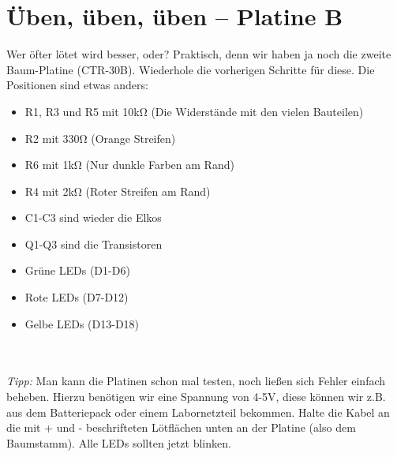 \documentclass[10pt]{article}
\begin{document}
	\section{Üben, üben, üben – Platine B}
	Wer öfter lötet wird besser, oder? Praktisch, denn wir haben ja noch die zweite Baum-Platine (CTR-30B). Wiederhole die vorherigen Schritte für diese. Die Positionen sind etwas anders:
	
	\begin{minipage}{0.5\textwidth}
		\begin{itemize}
			\item R1, R3 und R5 mit 10kΩ (Die Widerstände mit den vielen Bauteilen)
			\item R2 mit 330Ω (Orange Streifen)
			\item R6 mit 1kΩ (Nur dunkle Farben am Rand)
			\item R4 mit 2kΩ (Roter Streifen am Rand)
			\item C1-C3 sind wieder die Elkos
		\end{itemize}
	\end{minipage}
	\begin{minipage}{0.5\textwidth}\raggedright
		\begin{itemize}
			\item Q1-Q3 sind die Transistoren		
			\item Grüne LEDs (D1-D6)
			\item Rote LEDs (D7-D12)
			\item Gelbe LEDs (D13-D18)
		\end{itemize}
	\end{minipage}
	\\~\\
	\emph{Tipp:} Man kann die Platinen schon mal testen, noch ließen sich Fehler einfach beheben. Hierzu benötigen wir eine Spannung von 4-5V, diese können wir z.B. aus dem Batteriepack oder einem Labornetzteil bekommen. Halte die Kabel an die mit + und - beschrifteten Lötflächen unten an der Platine (also dem Baumstamm). Alle LEDs sollten jetzt blinken.
	
\end{document}
